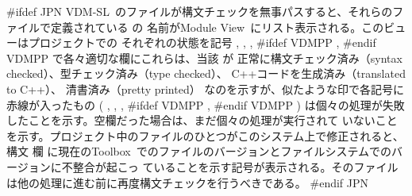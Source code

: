 \documentclass[\pformat,12pt]{article}
\newcommand{\vdmslpp}{VDM-SL}
\newcommand{\Toolbox}{Toolbox}
\newcommand{\vdmModView}{\guicmd{Module View}}
\newcommand{\vdmModView}{\guicmd{モジュールビュー}}
\newcommand{\vdmslpp}{VDM++}
\newcommand{\Toolbox}{Toolbox}
\newcommand{\vdmModView}{\guicmd{VDM View}}
\newcommand{\vdmModView}{\guicmd{VDMビュー}}
\newcommand{\guicmd}[1]{{\sf #1}}
\newcommand{\guicmd}[1]{{\gt #1}}
\begin{document}
#ifdef JPN
\vdmslpp\ のファイルが構文チェックを無事パスすると、それらのファイルで定義されている
 の
名前が\vdmModView\ にリスト表示される。このビューはプロジェクトでの
 それぞれの状態を記号
,
,
,
#ifdef VDMPP
,
#endif VDMPP
で各々適切な欄にこれらは、当該 が
正常に構文チェック済み（syntax checked）、型チェック済み（type checked）、
C++コードを生成済み（translated to C++）、
 清書済み（pretty printed）
なのを示すが、似たような印で各記号に赤線が入ったもの
(%
,
,
,
#ifdef VDMPP
,
#endif VDMPP
)
は個々の処理が失敗したことを示す。空欄だった場合は、まだ個々の処理が実行されて
いないことを示す。プロジェクト中のファイルのひとつがこのシステム上で修正されると、\guicmd{構文} 欄
に現在の\Toolbox\ でのファイルのバージョンとファイルシステムでのバージョンに不整合が起こっ
ていることを示す記号が表示される。そのファイルは他の処理に進む前に再度構文チェックを行うべきである。
#endif JPN
\end{document}
